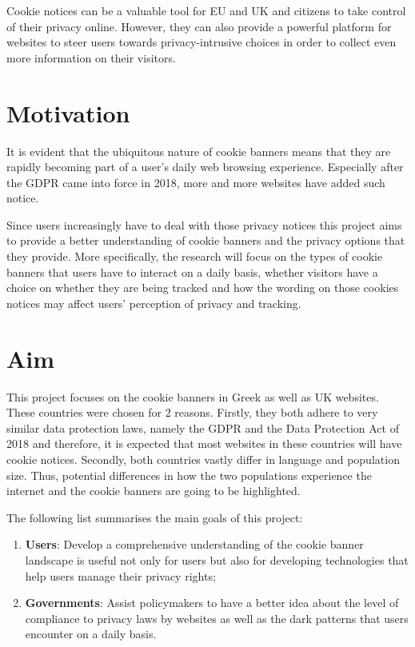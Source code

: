 \documentclass[../main.tex]{subfiles}
\begin{document}
Cookie notices can be a valuable tool for EU and UK and citizens to take control of their privacy online. However, they can also provide a powerful platform for websites to steer users towards privacy-intrusive choices in order to collect even more information on their visitors. 

\section{Motivation}
It is evident that the ubiquitous nature of cookie banners means that they are rapidly becoming part of a user’s daily web browsing experience. Especially after the GDPR came into force in 2018, more and more websites have added such notice. 

Since users increasingly have to deal with those privacy notices this project aims to provide a better understanding of cookie banners and the privacy options that they provide. More specifically, the research will focus on the types of cookie banners that users have to interact on a daily basis, whether visitors have a choice on whether they are being tracked and how the wording on those cookies notices may affect users’ perception of privacy and tracking.

\section{Aim}
This project focuses on the cookie banners in Greek as well as UK websites. These countries were chosen for 2 reasons. Firstly, they both adhere to very similar data protection laws, namely the GDPR and the Data Protection Act of 2018 and therefore, it is expected that most websites in these countries will have cookie notices. Secondly, both countries vastly differ in language and population size. Thus, potential differences in how the two populations experience the internet and the cookie banners are going to be highlighted.

The following list summarises the main goals of this project:

\begin{enumerate}
    \item \textbf{Users}: Develop a comprehensive understanding of the cookie banner landscape is useful not only for users but also for developing technologies that help users manage their privacy rights;
    \item \textbf{Governments}: Assist policymakers to have a better idea about the level of compliance to privacy laws by websites as well as the dark patterns that users encounter on a daily basis.
\end{enumerate}
\end{document}
